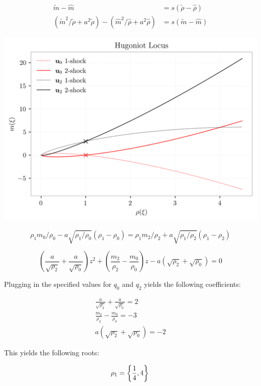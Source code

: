\documentclass[
  11pt,
]{article}
\let\origfigure\figure
\let\endorigfigure\endfigure
\renewenvironment{figure}[1][2] {
    \expandafter\origfigure\expandafter[H]
} {
    \endorigfigure
}
\begin{document}
\[
\begin{aligned}
\tilde{m}-\hat{m} &=s(\tilde{\rho}-\hat{\rho}) \\
\left(\tilde{m}^{2} / \tilde{\rho}+a^{2} \tilde{\rho}\right)-\left(\hat{m}^{2} / \hat{\rho}+a^{2} \hat{\rho}\right) &=s(\tilde{m}-\hat{m})
\end{aligned}
\]

\begin{figure}
\centering
\includegraphics{../img/p1-locus.png}
\caption{Graphical solution of the isothermal Riemann problem}
\end{figure}

\[
\rho_{1} m_{0} / \rho_{0}-a \sqrt{\rho_{1} / \rho_{0}}\left(\rho_{1}-\rho_{0}\right)=\rho_{1} m_{2} / \rho_{2}+a \sqrt{\rho_{1} / \rho_{2}}\left(\rho_{1}-\rho_{2}\right)
\]

\[
\left(\frac{a}{\sqrt{\rho_{2}}}+\frac{a}{\sqrt{\rho_{0}}}\right) z^{2}+\left(\frac{m_{2}}{\rho_{2}}-\frac{m_{0}}{\rho_{0}}\right) z-a\left(\sqrt{\rho_{2}}+\sqrt{\rho_{0}}\right)=0
\]

Plugging in the specified values for \(q_0\) and \(q_2\) yields the
following coefficients:

\[
\begin{aligned}
\frac{a}{\sqrt{\rho_{2}}}+\frac{a}{\sqrt{\rho_{0}}} = 2\\
\frac{m_{2}}{\rho_{2}}-\frac{m_{0}}{\rho_{0}} = -3\\
a\left(\sqrt{\rho_{2}}+\sqrt{\rho_{0}}\right) = -2
\end{aligned}
\]

This yields the following roots:

\[
\rho_1 = \left\{\frac{1}{4}, 4\right\} \\
\]
\end{document}
